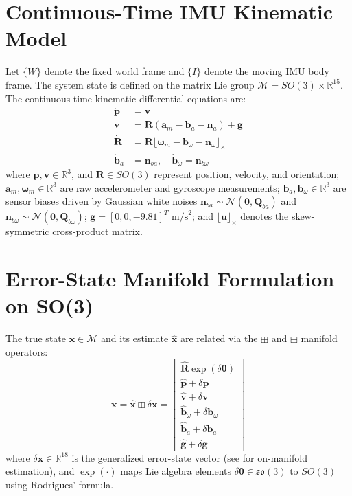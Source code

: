 \documentclass[11pt,a4paper]{report}
\begin{document}
\section{Continuous-Time IMU Kinematic Model}
Let $\{W\}$ denote the fixed world frame and $\{I\}$ denote the moving IMU body frame. The system state is defined on the matrix Lie group $\mathcal{M} = SO(3) \times \mathbb{R}^{15}$. The continuous-time kinematic differential equations are:
\begin{align}
    \dot{\mathbf{p}} &= \mathbf{v} \label{eq:pos}\\
    \dot{\mathbf{v}} &= \mathbf{R} (\mathbf{a}_m - \mathbf{b}_a - \mathbf{n}_a) + \mathbf{g} \label{eq:vel}\\
    \dot{\mathbf{R}} &= \mathbf{R} \lfloor \boldsymbol{\omega}_m - \mathbf{b}_\omega - \mathbf{n}_\omega \rfloor_\times \label{eq:rot}\\
    \dot{\mathbf{b}}_a &= \mathbf{n}_{ba}, \quad \dot{\mathbf{b}}_\omega = \mathbf{n}_{b\omega} \label{eq:bias}
\end{align}
where $\mathbf{p}, \mathbf{v} \in \mathbb{R}^3$, and $\mathbf{R} \in SO(3)$ represent position, velocity, and orientation; $\mathbf{a}_m, \boldsymbol{\omega}_m \in \mathbb{R}^3$ are raw accelerometer and gyroscope measurements; $\mathbf{b}_a, \mathbf{b}_\omega \in \mathbb{R}^3$ are sensor biases driven by Gaussian white noises $\mathbf{n}_{ba} \sim \mathcal{N}(\mathbf{0}, \mathbf{Q}_{ba})$ and $\mathbf{n}_{b\omega} \sim \mathcal{N}(\mathbf{0}, \mathbf{Q}_{b\omega})$; $\mathbf{g} = [0, 0, -9.81]^T\text{ m/s}^2$; and $\lfloor \mathbf{u} \rfloor_\times$ denotes the skew-symmetric cross-product matrix.

\section{Error-State Manifold Formulation on SO(3)}
The true state $\mathbf{x} \in \mathcal{M}$ and its estimate $\hat{\mathbf{x}}$ are related via the $\boxplus$ and $\boxminus$ manifold operators:
\begin{equation}
    \mathbf{x} = \hat{\mathbf{x}} \boxplus \delta \mathbf{x} = \begin{bmatrix}
        \hat{\mathbf{R}} \exp(\delta \boldsymbol{\theta}) \\
        \hat{\mathbf{p}} + \delta \mathbf{p} \\
        \hat{\mathbf{v}} + \delta \mathbf{v} \\
        \hat{\mathbf{b}}_\omega + \delta \mathbf{b}_\omega \\
        \hat{\mathbf{b}}_a + \delta \mathbf{b}_a \\
        \hat{\mathbf{g}} + \delta \mathbf{g}
    \end{bmatrix}
\end{equation}
where $\delta \mathbf{x} \in \mathbb{R}^{18}$ is the generalized error-state vector (see \cite{forster2016manifold, sola2017micro} for on-manifold estimation), and $\exp(\cdot)$ maps Lie algebra elements $\delta \boldsymbol{\theta} \in \mathfrak{so}(3)$ to $SO(3)$ using Rodrigues' formula.
\end{document}
